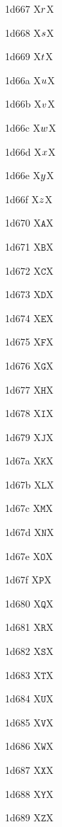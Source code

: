 \documentclass[11pt]{article}
\begin{document}
1d667 X{\ensuremath{\mathsfbfsl{r}}}X

1d668 X{\ensuremath{\mathsfbfsl{s}}}X

1d669 X{\ensuremath{\mathsfbfsl{t}}}X

1d66a X{\ensuremath{\mathsfbfsl{u}}}X

1d66b X{\ensuremath{\mathsfbfsl{v}}}X

1d66c X{\ensuremath{\mathsfbfsl{w}}}X

1d66d X{\ensuremath{\mathsfbfsl{x}}}X

1d66e X{\ensuremath{\mathsfbfsl{y}}}X

1d66f X{\ensuremath{\mathsfbfsl{z}}}X

1d670 X{\ensuremath{\mathtt{A}}}X

1d671 X{\ensuremath{\mathtt{B}}}X

1d672 X{\ensuremath{\mathtt{C}}}X

1d673 X{\ensuremath{\mathtt{D}}}X

1d674 X{\ensuremath{\mathtt{E}}}X

1d675 X{\ensuremath{\mathtt{F}}}X

1d676 X{\ensuremath{\mathtt{G}}}X

1d677 X{\ensuremath{\mathtt{H}}}X

1d678 X{\ensuremath{\mathtt{I}}}X

1d679 X{\ensuremath{\mathtt{J}}}X

1d67a X{\ensuremath{\mathtt{K}}}X

1d67b X{\ensuremath{\mathtt{L}}}X

1d67c X{\ensuremath{\mathtt{M}}}X

1d67d X{\ensuremath{\mathtt{N}}}X

1d67e X{\ensuremath{\mathtt{O}}}X

1d67f X{\ensuremath{\mathtt{P}}}X

1d680 X{\ensuremath{\mathtt{Q}}}X

1d681 X{\ensuremath{\mathtt{R}}}X

1d682 X{\ensuremath{\mathtt{S}}}X

1d683 X{\ensuremath{\mathtt{T}}}X

1d684 X{\ensuremath{\mathtt{U}}}X

1d685 X{\ensuremath{\mathtt{V}}}X

1d686 X{\ensuremath{\mathtt{W}}}X

1d687 X{\ensuremath{\mathtt{X}}}X

1d688 X{\ensuremath{\mathtt{Y}}}X

1d689 X{\ensuremath{\mathtt{Z}}}X
\end{document}

